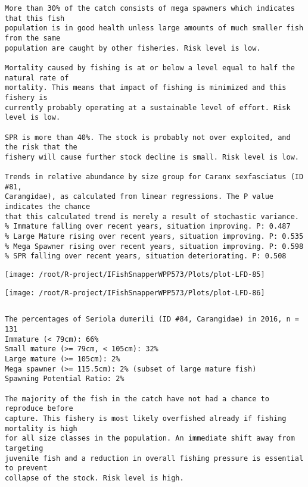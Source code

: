 \documentclass{report}\usepackage[]{graphicx}\usepackage[]{color}
\makeatletter
\def\maxwidth{ %
  \ifdim\Gin@nat@width>\linewidth
    \linewidth
  \else
    \Gin@nat@width
  \fi
}
\newenvironment{kframe}{%
 \def\at@end@of@kframe{}%
 \ifinner\ifhmode%
  \def\at@end@of@kframe{\end{minipage}}%
  \begin{minipage}{\columnwidth}%
 \fi\fi%
 \def\FrameCommand##1{\hskip\@totalleftmargin \hskip-\fboxsep
 \colorbox{shadecolor}{##1}\hskip-\fboxsep
     \hskip-\linewidth \hskip-\@totalleftmargin \hskip\columnwidth}%
 \MakeFramed {\advance\hsize-\width
   \@totalleftmargin\z@ \linewidth\hsize
   \@setminipage}}%
 {\par\unskip\endMakeFramed%
 \at@end@of@kframe}
\newenvironment{knitrout}{}{} %
\makeatother
\begin{document}
\begin{knitrout}
\begin{kframe}
\begin{verbatim}
More than 30% of the catch consists of mega spawners which indicates that this fish
population is in good health unless large amounts of much smaller fish from the same
population are caught by other fisheries. Risk level is low.
 
Mortality caused by fishing is at or below a level equal to half the natural rate of
mortality. This means that impact of fishing is minimized and this fishery is
currently probably operating at a sustainable level of effort. Risk level is low.
 
SPR is more than 40%. The stock is probably not over exploited, and the risk that the
fishery will cause further stock decline is small. Risk level is low.
 
Trends in relative abundance by size group for Caranx sexfasciatus (ID #81,
Carangidae), as calculated from linear regressions. The P value indicates the chance
that this calculated trend is merely a result of stochastic variance.
% Immature falling over recent years, situation improving. P: 0.487
% Large Mature rising over recent years, situation improving. P: 0.535
% Mega Spawner rising over recent years, situation improving. P: 0.598
% SPR falling over recent years, situation deteriorating. P: 0.508
\end{verbatim}
\end{kframe}
\texttt{[image: /root/R-project/IFishSnapperWPP573/Plots/plot-LFD-85]} 

\texttt{[image: /root/R-project/IFishSnapperWPP573/Plots/plot-LFD-86]} 
\begin{kframe}\begin{verbatim}
\end{verbatim}
\end{kframe}
\clearpage
\newpage
\begin{kframe}\begin{verbatim}The percentages of Seriola dumerili (ID #84, Carangidae) in 2016, n = 131
Immature (< 79cm): 66%
Small mature (>= 79cm, < 105cm): 32%
Large mature (>= 105cm): 2%
Mega spawner (>= 115.5cm): 2% (subset of large mature fish)
Spawning Potential Ratio: 2%
 
The majority of the fish in the catch have not had a chance to reproduce before
capture. This fishery is most likely overfished already if fishing mortality is high
for all size classes in the population. An immediate shift away from targeting
juvenile fish and a reduction in overall fishing pressure is essential to prevent
collapse of the stock. Risk level is high.


\end{verbatim}
\end{kframe}
\end{knitrout}
\end{document}
